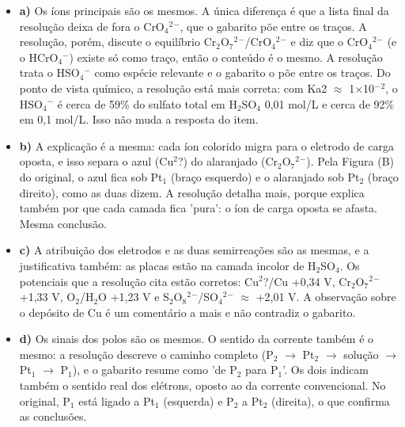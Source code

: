 \documentclass{article}%
\begin{document}
\begin{itemize}%
\item%
\textbf{a)} Os íons principais são os mesmos. A única diferença é que a lista final da resolução deixa de fora o CrO$_{4}$$^2$$^{-}$, que o gabarito põe entre os traços. A resolução, porém, discute o equilíbrio Cr$_{2}$O$_{7}$$^2$$^{-}$/CrO$_{4}$$^2$$^{-}$ e diz que o CrO$_{4}$$^2$$^{-}$ (e o HCrO$_{4}$$^{-}$) existe só como traço, então o conteúdo é o mesmo. A resolução trata o HSO$_{4}$$^{-}$ como espécie relevante e o gabarito o põe entre os traços. Do ponto de vista químico, a resolução está mais correta: com Ka2 $\approx$ 1$\times$10$^{-}$$^2$, o HSO$_{4}$$^{-}$ é cerca de 59\% do sulfato total em H$_{2}$SO$_{4}$ 0,01 mol/L e cerca de 92\% em 0,1 mol/L. Isso não muda a resposta do item.%
\item%
\textbf{b)} A explicação é a mesma: cada íon colorido migra para o eletrodo de carga oposta, e isso separa o azul (Cu$^2$?) do alaranjado (Cr$_{2}$O$_{7}$$^2$$^{-}$). Pela Figura (B) do original, o azul fica sob Pt$_{1}$ (braço esquerdo) e o alaranjado sob Pt$_{2}$ (braço direito), como as duas dizem. A resolução detalha mais, porque explica também por que cada camada fica 'pura': o íon de carga oposta se afasta. Mesma conclusão.%
\item%
\textbf{c)} A atribuição dos eletrodos e as duas semirreações são as mesmas, e a justificativa também: as placas estão na camada incolor de H$_{2}$SO$_{4}$. Os potenciais que a resolução cita estão corretos: Cu$^2$?/Cu +0,34 V, Cr$_{2}$O$_{7}$$^2$$^{-}$ +1,33 V, O$_{2}$/H$_{2}$O +1,23 V e S$_{2}$O$_{8}$$^2$$^{-}$/SO$_{4}$$^2$$^{-}$ $\approx$ +2,01 V. A observação sobre o depósito de Cu é um comentário a mais e não contradiz o gabarito.%
\item%
\textbf{d)} Os sinais dos polos são os mesmos. O sentido da corrente também é o mesmo: a resolução descreve o caminho completo (P$_{2}$ $\to$ Pt$_{2}$ $\to$ solução $\to$ Pt$_{1}$ $\to$ P$_{1}$), e o gabarito resume como 'de P$_{2}$ para P$_{1}$'. Os dois indicam também o sentido real dos elétrons, oposto ao da corrente convencional. No original, P$_{1}$ está ligado a Pt$_{1}$ (esquerda) e P$_{2}$ a Pt$_{2}$ (direita), o que confirma as conclusões.%
\end{itemize}%
\end{document}
